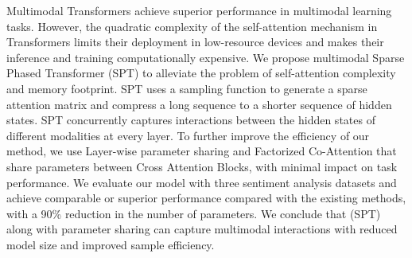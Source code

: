 Multimodal Transformers achieve superior performance in multimodal learning tasks. However, the quadratic complexity of the self-attention mechanism in Transformers limits their deployment in low-resource devices and makes their inference and training computationally expensive. We propose multimodal Sparse Phased Transformer (SPT) to alleviate the problem of self-attention complexity and memory footprint. SPT uses a sampling function to generate a sparse attention matrix and compress a long sequence to a shorter sequence of hidden states. SPT concurrently captures interactions between the hidden states of different modalities at every layer. To further improve the efficiency of our method, we use Layer-wise parameter sharing and Factorized Co-Attention that share parameters between Cross Attention Blocks, with minimal impact on task performance. We evaluate our model with three sentiment analysis datasets and achieve comparable or superior performance compared with the existing methods, with a 90\% reduction in the number of parameters. We conclude that (SPT) along with parameter sharing can capture multimodal interactions with reduced model size and improved sample efficiency.
